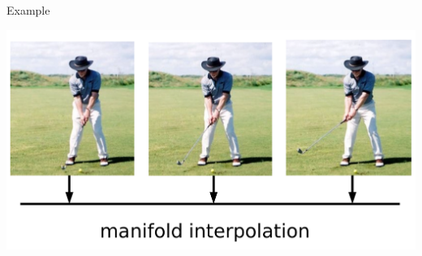 \documentclass[xcolor={dvipsnames,table}]{beamer}
\begin{document}
\begin{frame}{Example}
	\begin{center}
     	\includegraphics[width=\linewidth]{golfm.png}
     \end{center}
\end{frame}
\end{document}
